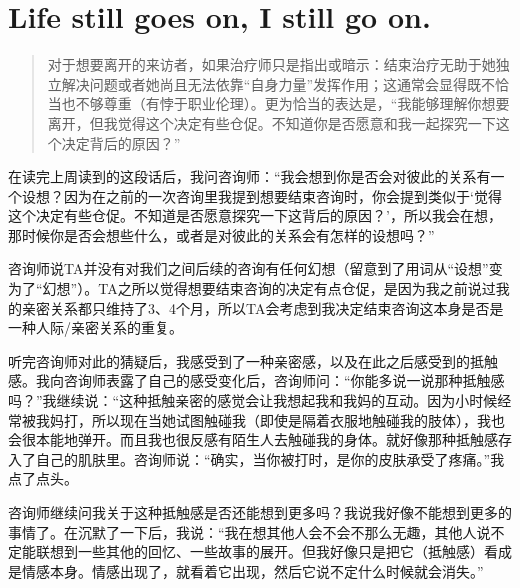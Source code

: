 \chapter{Life still goes on, I still go on.}



\blockquote{
	对于想要离开的来访者，如果治疗师只是指出或暗示：结束治疗无助于她独立解决问题或者她尚且无法依靠“自身力量”发挥作用；这通常会显得既不恰当也不够尊重（有悖于职业伦理）。更为恰当的表达是，“我能够理解你想要离开，但我觉得这个决定有些仓促。不知道你是否愿意和我一起探究一下这个决定背后的原因？”
}

在读完上周读到的这段话后，我问咨询师：“我会想到你是否会对彼此的关系有一个设想？因为在之前的一次咨询里我提到想要结束咨询时，你会提到类似于‘觉得这个决定有些仓促。不知道是否愿意探究一下这背后的原因？’，所以我会在想，那时候你是否会想些什么，或者是对彼此的关系会有怎样的设想吗？”

咨询师说TA并没有对我们之间后续的咨询有任何幻想（留意到了用词从“设想”变为了“幻想”）。TA之所以觉得想要结束咨询的决定有点仓促，是因为我之前说过我的亲密关系都只维持了3、4个月，所以TA会考虑到我决定结束咨询这本身是否是一种人际/亲密关系的重复。

听完咨询师对此的猜疑后，我感受到了一种亲密感，以及在此之后感受到的抵触感。我向咨询师表露了自己的感受变化后，咨询师问：“你能多说一说那种抵触感吗？”我继续说：“这种抵触亲密的感觉会让我想起我和我妈的互动。因为小时候经常被我妈打，所以现在当她试图触碰我（即使是隔着衣服地触碰我的肢体），我也会很本能地弹开。而且我也很反感有陌生人去触碰我的身体。就好像那种抵触感存入了自己的肌肤里。咨询师说：“确实，当你被打时，是你的皮肤承受了疼痛。”我点了点头。

咨询师继续问我关于这种抵触感是否还能想到更多吗？我说我好像不能想到更多的事情了。在沉默了一下后，我说：“我在想其他人会不会不那么无趣，其他人说不定能联想到一些其他的回忆、一些故事的展开。但我好像只是把它（抵触感）看成是情感本身。情感出现了，就看着它出现，然后它说不定什么时候就会消失。”

